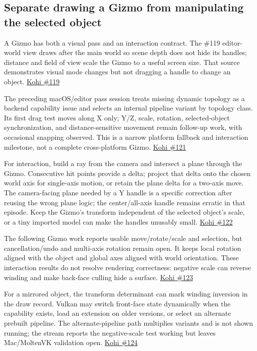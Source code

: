 \subsection{Separate drawing a Gizmo from manipulating the selected object}\label{06-engine-ii-ch032-separate-drawing-a-gizmo-from-manipulating-the-selected-object}

A Gizmo has both a visual pass and an interaction contract. The \#119 editor-world view draws after the main world so scene depth does not hide its handles; distance and field of view scale the Gizmo to a useful screen size. That source demonstrates visual mode changes but not dragging a handle to change an object. \href{https://www.youtube.com/watch?v=pPWshwZB7eo}{Kohi \#119}

The preceding macOS/editor pass session treats missing dynamic topology as a backend capability issue and selects an internal pipeline variant by topology class. Its first drag test moves along X only; Y/Z, scale, rotation, selected-object synchronization, and distance-sensitive movement remain follow-up work, with occasional snapping observed. This is a narrow platform fallback and interaction milestone, not a complete cross-platform Gizmo. \href{https://www.youtube.com/watch?v=dU6XqDBJJO4}{Kohi \#121}

For interaction, build a ray from the camera and intersect a plane through the Gizmo. Consecutive hit points provide a delta; project that delta onto the chosen world axis for single-axis motion, or retain the plane delta for a two-axis move. The camera-facing plane needed by a Y handle is a specific correction after reusing the wrong plane logic; the center/all-axis handle remains erratic in that episode. Keep the Gizmo's transform independent of the selected object's scale, or a tiny imported model can make the handles unusably small. \href{https://www.youtube.com/watch?v=MWraFUbYBN4}{Kohi \#122}

The following Gizmo work reports usable move/rotate/scale and selection, but cancellation/undo and multi-axis rotation remain open. It keeps local rotation aligned with the object and global axes aligned with world orientation. These interaction results do not resolve rendering correctness: negative scale can reverse winding and make back-face culling hide a surface. \href{https://www.youtube.com/watch?v=SdMihp51X_o}{Kohi \#123}

For a mirrored object, the transform determinant can mark winding inversion in the draw record. Vulkan may switch front-face state dynamically when the capability exists, load an extension on older versions, or select an alternate prebuilt pipeline. The alternate-pipeline path multiplies variants and is not shown running; the stream reports the negative-scale test working but leaves Mac/MoltenVK validation open. \href{https://www.youtube.com/watch?v=sCX_Sw0G4Ag}{Kohi \#124}

